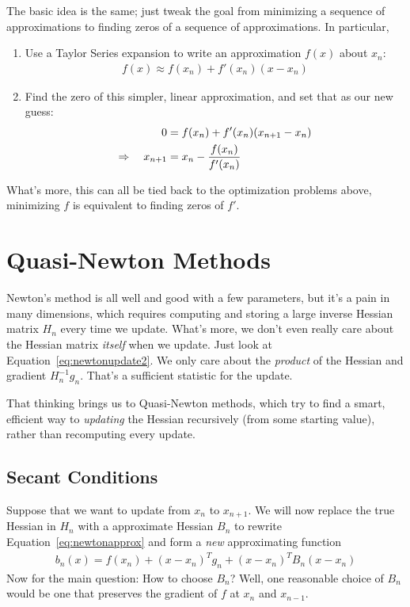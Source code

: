 \documentclass[a4paper,12pt]{scrartcl}
\theoremstyle{definition}
\theoremstyle{remark}
\begin{document}
The basic idea is the same; just tweak the goal from minimizing a
sequence of approximations to finding zeros of a sequence of
approximations. In particular,
\begin{enumerate}
  \item Use a Taylor Series expansion to write an approximation $f(x)$
    about $x_n$:
    \begin{align*}
      f(x) \approx f(x_n) + f'(x_n)(x-x_n)
    \end{align*}

  \item Find the zero of this simpler, linear approximation, and set
    that as our new guess:
    \begin{align}
      0 &= f(x_n) + f'(x_n)(x_{n+1}-x_n)\notag\\
      \Rightarrow \quad x_{n+1} &= x_n - \frac{f(x_n)}{f'(x_n)}
    \end{align}
\end{enumerate}
What's more, this can all be tied back to the optimization problems
above, minimizing $f$ is equivalent to finding zeros of $f'$.

\section{Quasi-Newton Methods}

Newton's method is all well and good with a few parameters, but it's a
pain in many dimensions, which requires computing and storing a large
inverse Hessian matrix $H_n$ every time we update. What's more, we don't
even really care about the Hessian matrix \emph{itself} when we update.
Just look at Equation~\ref{eq:newtonupdate2}. We only care about the
\emph{product} of the Hessian and gradient $H_n^{-1} g_n$. That's a
sufficient statistic for the update.

That thinking brings us to Quasi-Newton methods, which try to find a
smart, efficient way to \emph{updating} the Hessian recursively (from
some starting value), rather than recomputing every update.

\subsection{Secant Conditions}

Suppose that we want to update from $x_n$ to $x_{n+1}$. We will now
replace the true Hessian in $H_n$ with a approximate Hessian $B_n$ to
rewrite Equation~\ref{eq:newtonapprox} and form a \emph{new}
approximating function
\begin{align}
  b_n(x) = f(x_n) + (x-x_n)^Tg_n + (x-x_n)^T B_n (x-x_n)
  \label{eq:quasinewtonapprox}
\end{align}
Now for the main question: How to choose $B_n$? Well, one reasonable
choice of $B_n$ would be one that preserves the gradient of $f$ at $x_n$
and $x_{n-1}$.
\end{document}
